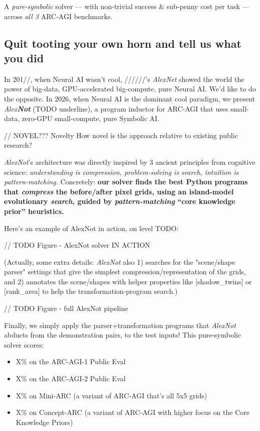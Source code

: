 \documentclass{article}
\begin{document}
A \textit{pure-symbolic} solver — with non-trivial success \& sub-penny cost per task — across \textit{all 3} ARC-AGI benchmarks.

\subsection{Quit tooting your own horn and tell us what you did}

In 201//, when Neural AI wasn't cool, //////'s \textit{AlexNet} showed the world the power of big-data, GPU-accelerated big-compute, pure Neural AI. We'd like to do the opposite. In 2026, when Neural AI is the dominant cool paradigm, we present \textit{Alex\textbf{N\textbf{o}t}} (TODO underline), a program inductor for ARC-AGI that uses small-data, zero-GPU small-compute, pure Symbolic AI.

// NOVEL??? Novelty How novel is the approach relative to existing public research?

\textit{AlexNot}'s architecture was directly inspired by 3 ancient principles from cognitive science: \textit{understanding is compression, problem-solving is search, intuition is pattern-matching.} Concretely: \textbf{our solver finds the best Python programs that \textit{compress} the before/after pixel grids, using an island-model evolutionary \textit{search}, guided by \textit{pattern-matching} ``core knowledge prior'' heuristics.}

Here's an example of AlexNot in action, on level TODO:

// TODO Figure - AlexNot solver IN ACTION

(Actually, some extra details: \textit{AlexNot} also 1) searches for the "scene/shape parser" settings that give the simplest compression/representation of the grids, and 2) annotates the scene/shapes with helper properties like [shadow\_twins] or [rank\_area] to help the transformation-program search.)

// TODO Figure - full AlexNot pipeline

Finally, we simply apply the parser+transformation programs that \textit{AlexNot} abducts from the demonstration pairs, to the test inputs! This pure-symbolic solver scores:

\begin{itemize}
    \item X\% on the ARC-AGI-1 Public Eval
    \item X\% on the ARC-AGI-2 Public Eval
    \item X\% on Mini-ARC (a variant of ARC-AGI that's all 5x5 grids)
    \item X\% on Concept-ARC (a variant of ARC-AGI with higher focus on the Core Knowledge Priors)
\end{itemize}
\end{document}
